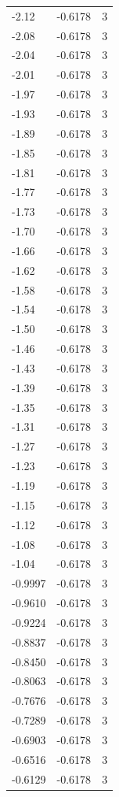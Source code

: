 \begin{longtable}{lrr}
  -2.12 & -0.6178 & 3 \\
  -2.08 & -0.6178 & 3 \\
  -2.04 & -0.6178 & 3 \\
  -2.01 & -0.6178 & 3 \\
  -1.97 & -0.6178 & 3 \\
  -1.93 & -0.6178 & 3 \\
  -1.89 & -0.6178 & 3 \\
  -1.85 & -0.6178 & 3 \\
  -1.81 & -0.6178 & 3 \\
  -1.77 & -0.6178 & 3 \\
  -1.73 & -0.6178 & 3 \\
  -1.70 & -0.6178 & 3 \\
  -1.66 & -0.6178 & 3 \\
  -1.62 & -0.6178 & 3 \\
  -1.58 & -0.6178 & 3 \\
  -1.54 & -0.6178 & 3 \\
  -1.50 & -0.6178 & 3 \\
  -1.46 & -0.6178 & 3 \\
  -1.43 & -0.6178 & 3 \\
  -1.39 & -0.6178 & 3 \\
  -1.35 & -0.6178 & 3 \\
  -1.31 & -0.6178 & 3 \\
  -1.27 & -0.6178 & 3 \\
  -1.23 & -0.6178 & 3 \\
  -1.19 & -0.6178 & 3 \\
  -1.15 & -0.6178 & 3 \\
  -1.12 & -0.6178 & 3 \\
  -1.08 & -0.6178 & 3 \\
  -1.04 & -0.6178 & 3 \\
  -0.9997 & -0.6178 & 3 \\
  -0.9610 & -0.6178 & 3 \\
  -0.9224 & -0.6178 & 3 \\
  -0.8837 & -0.6178 & 3 \\
  -0.8450 & -0.6178 & 3 \\
  -0.8063 & -0.6178 & 3 \\
  -0.7676 & -0.6178 & 3 \\
  -0.7289 & -0.6178 & 3 \\
  -0.6903 & -0.6178 & 3 \\
  -0.6516 & -0.6178 & 3 \\
  -0.6129 & -0.6178 & 3 \\

\end{longtable}
